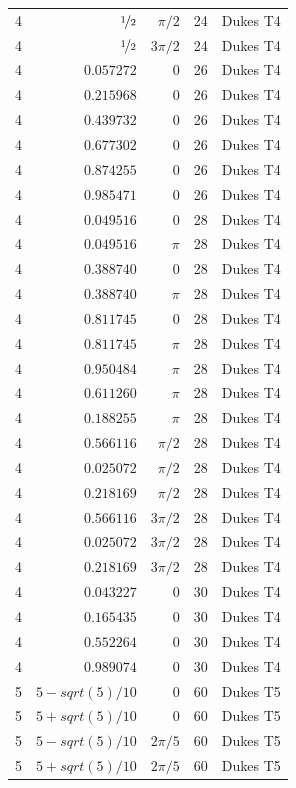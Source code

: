 \documentclass[aps,pra,reprint,amsmath,amssymb,superscriptaddress,floatfix]{revtex4-2}
\def\frac#1#2{#1/#2}%
\def\sqrt#1{sqrt(#1)}%
\begin{document}
\begin{longtable}{rrrrc}
4 & $\nicefrac{1}{2}$ & $\pi/2$ & 24 & Dukes T4 \\
4 & $\nicefrac{1}{2}$ & $3\pi/2$ & 24 & Dukes T4 \\
4 & $0.057272$ & $0$ & 26 & Dukes T4 \\
4 & $0.215968$ & $0$ & 26 & Dukes T4 \\
4 & $0.439732$ & $0$ & 26 & Dukes T4 \\
4 & $0.677302$ & $0$ & 26 & Dukes T4 \\
4 & $0.874255$ & $0$ & 26 & Dukes T4 \\
4 & $0.985471$ & $0$ & 26 & Dukes T4 \\
4 & $0.049516$ & $0$ & 28 & Dukes T4 \\
4 & $0.049516$ & $\pi$ & 28 & Dukes T4 \\
4 & $0.388740$ & $0$ & 28 & Dukes T4 \\
4 & $0.388740$ & $\pi$ & 28 & Dukes T4 \\
4 & $0.811745$ & $0$ & 28 & Dukes T4 \\
4 & $0.811745$ & $\pi$ & 28 & Dukes T4 \\
4 & $0.950484$ & $\pi$ & 28 & Dukes T4 \\
4 & $0.611260$ & $\pi$ & 28 & Dukes T4 \\
4 & $0.188255$ & $\pi$ & 28 & Dukes T4 \\
4 & $0.566116$ & $\pi/2$ & 28 & Dukes T4 \\
4 & $0.025072$ & $\pi/2$ & 28 & Dukes T4 \\
4 & $0.218169$ & $\pi/2$ & 28 & Dukes T4 \\
4 & $0.566116$ & $3\pi/2$ & 28 & Dukes T4 \\
4 & $0.025072$ & $3\pi/2$ & 28 & Dukes T4 \\
4 & $0.218169$ & $3\pi/2$ & 28 & Dukes T4 \\
4 & $0.043227$ & $0$ & 30 & Dukes T4 \\
4 & $0.165435$ & $0$ & 30 & Dukes T4 \\
4 & $0.552264$ & $0$ & 30 & Dukes T4 \\
4 & $0.989074$ & $0$ & 30 & Dukes T4 \\
5 & $\frac{5 - \sqrt{5}}{10}$ & $0$ & 60 & Dukes T5 \\
5 & $\frac{5 + \sqrt{5}}{10}$ & $0$ & 60 & Dukes T5 \\
5 & $\frac{5 - \sqrt{5}}{10}$ & $2\pi/5$ & 60 & Dukes T5 \\
5 & $\frac{5 + \sqrt{5}}{10}$ & $2\pi/5$ & 60 & Dukes T5 \\

\end{longtable}
\end{document}
